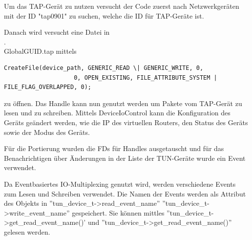 Um das TAP-Gerät zu nutzen versucht der Code zuerst nach Netzwerkgeräten mit der ID "tap0901" zu suchen,
welche die ID für TAP-Geräte ist.

Danach wird versucht eine Datei in \\.\\Global\/GUID.tap mittels 
\begin{lstlisting}
CreateFile(device_path, GENERIC_READ \| GENERIC_WRITE, 0,
                    0, OPEN_EXISTING, FILE_ATTRIBUTE_SYSTEM | FILE_FLAG_OVERLAPPED, 0);
\end{lstlisting}
zu öffnen.
Das Handle kann nun genutzt werden um Pakete vom TAP-Gerät zu lesen und zu schreiben.
Mittels DeviceIoControl kann die Konfiguration des Geräts geändert werden,
wie die IP des virtuellen Routers, den Status des Geräts sowie der Modus des Geräts.

Für die Portierung wurden die \acp{FD} für Handles ausgetauscht und für das Benachrichtigen
über Änderungen in der Liste der TUN-Geräte wurde ein Event verwendet.

Da Eventbasiertes IO-Multiplexing genutzt wird, werden verschiedene Events zum Lesen
und Schreiben verwendet.
Die Namen der Events werden als Attribut des Objekts in ''tun\_device\_t->read\_event\_name''
''tun\_device\_t->write\_event\_name'' gespeichert. Sie können mittles ''tun\_device\_t->get\_read\_event\_name()'
und ''tun\_device\_t->get\_read\_event\_name()'' gelesen werden.

